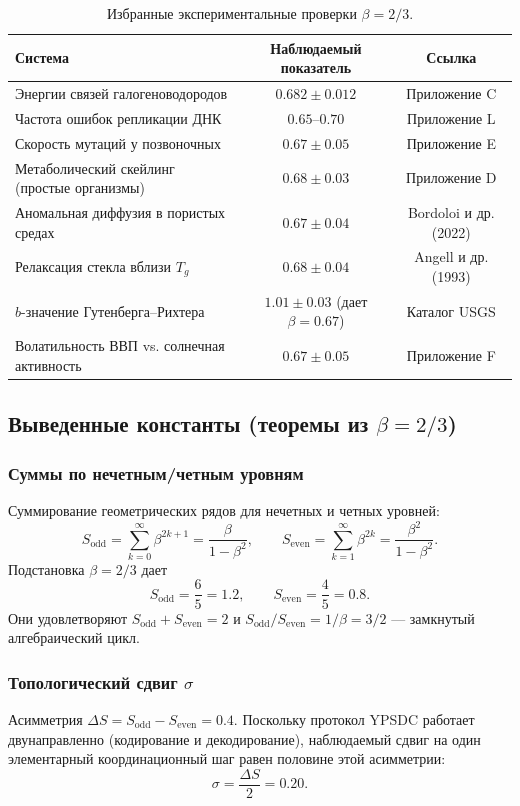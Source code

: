 \documentclass[11pt,a4paper]{article}
\begin{document}
	\begin{table}[H]
		\centering
		\caption{Избранные экспериментальные проверки \(\beta = 2/3\).}
		\label{tab:beta-evidence}
		\small
		\begin{tabular}{l c c}
			\toprule
			\textbf{Система} & \textbf{Наблюдаемый показатель} & \textbf{Ссылка} \\
			\midrule
			Энергии связей галогеноводородов & \(0.682 \pm 0.012\) & Приложение C \\
			Частота ошибок репликации ДНК & \(0.65\)–\(0.70\) & Приложение L \\
			Скорость мутаций у позвоночных & \(0.67 \pm 0.05\) & Приложение E \\
			Метаболический скейлинг (простые организмы) & \(0.68 \pm 0.03\) & Приложение D \\
			Аномальная диффузия в пористых средах & \(0.67 \pm 0.04\) & Bordoloi и др. (2022) \\
			Релаксация стекла вблизи \(T_g\) & \(0.68 \pm 0.04\) & Angell и др. (1993) \\
			\(b\)-значение Гутенберга–Рихтера & \(1.01 \pm 0.03\) (дает \(\beta=0.67\)) & Каталог USGS \\
			Волатильность ВВП vs. солнечная активность & \(0.67 \pm 0.05\) & Приложение F \\
			\bottomrule
		\end{tabular}
	\end{table}
	
	\subsection{Выведенные константы (теоремы из \(\beta = 2/3\))}
	
	\subsubsection{Суммы по нечетным/четным уровням}
	Суммирование геометрических рядов для нечетных и четных уровней:
	\[
	S_{\mathrm{odd}} = \sum_{k=0}^{\infty} \beta^{2k+1} = \frac{\beta}{1-\beta^2},\qquad
	S_{\mathrm{even}} = \sum_{k=1}^{\infty} \beta^{2k} = \frac{\beta^2}{1-\beta^2}.
	\]
	Подстановка \(\beta = 2/3\) дает
	\[
	\boxed{S_{\mathrm{odd}} = \frac{6}{5}=1.2,\qquad S_{\mathrm{even}} = \frac{4}{5}=0.8}.
	\]
	Они удовлетворяют \(S_{\mathrm{odd}}+S_{\mathrm{even}}=2\) и \(S_{\mathrm{odd}}/S_{\mathrm{even}} = 1/\beta = 3/2\) — замкнутый алгебраический цикл.
	
	\subsubsection{Топологический сдвиг \(\sigma\)}
	Асимметрия \(\Delta S = S_{\mathrm{odd}}-S_{\mathrm{even}} = 0.4\). Поскольку протокол YPSDC работает двунаправленно (кодирование и декодирование), наблюдаемый сдвиг на один элементарный координационный шаг равен половине этой асимметрии:
	\[
	\boxed{\sigma = \frac{\Delta S}{2} = 0.20}.
	\]
	
\end{document}
